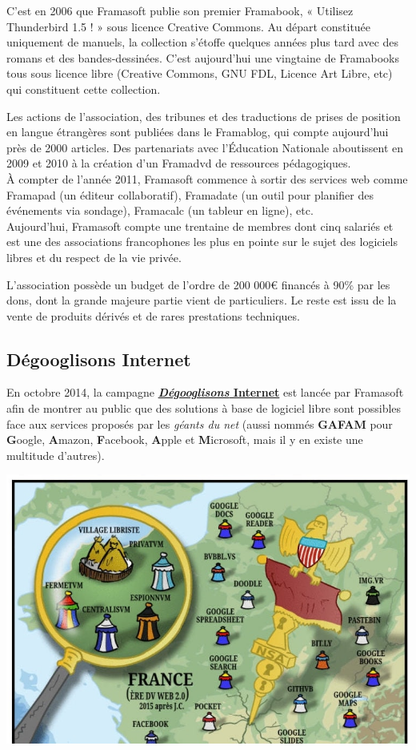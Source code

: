 \documentclass[10pt,a4paper]{report}
\begin{document}
	C'est en 2006 que Framasoft publie son premier Framabook, « Utilisez Thunderbird 1.5 ! » sous licence Creative Commons. Au départ constituée uniquement de manuels, la collection s'étoffe quelques années plus tard avec des romans et des bandes-dessinées. C'est aujourd'hui une vingtaine de Framabooks tous sous licence libre (Creative Commons, GNU FDL, Licence Art Libre, etc) qui constituent cette collection.
	
	Les actions de l'association, des tribunes et des traductions de prises de position en langue étrangères sont publiées dans le Framablog, qui compte aujourd'hui près de 2000 articles. Des partenariats avec l'Éducation Nationale aboutissent en 2009 et 2010 à la création d'un Framadvd de ressources pédagogiques.
	\\
	
	À compter de l'année 2011, Framasoft commence à sortir des services web comme Framapad (un éditeur collaboratif), Framadate (un outil pour planifier des événements via sondage), Framacalc (un tableur en ligne), etc.
	\\
	
	Aujourd'hui, Framasoft compte une trentaine de membres dont cinq salariés et est une des associations francophones les plus en pointe sur le sujet des logiciels libres et du respect de la vie privée.
	
	L'association possède un budget de l'ordre de 200 000\euro{} financés à 90\% par les dons, dont la grande majeure partie vient de particuliers. Le reste est issu de la vente de produits dérivés et de rares prestations techniques.
	
	\subsection{Dégooglisons Internet}
	
	En octobre 2014, la campagne \href{https://degooglisons-internet.org/}{\textbf{\textit{Dégooglisons} Internet}} est lancée par Framasoft afin de montrer au public que des solutions à base de logiciel libre sont possibles face aux services proposés par les \textit{géants du net} (aussi nommés \textbf{GAFAM} pour \textbf{G}oogle, \textbf{A}mazon, \textbf{F}acebook, \textbf{A}pple et \textbf{M}icrosoft, mais il y en existe une multitude d'autres).
	

	\centerline{\includegraphics[width=1\textwidth]{images/degooglisons-internet.jpg}}
\end{document}
